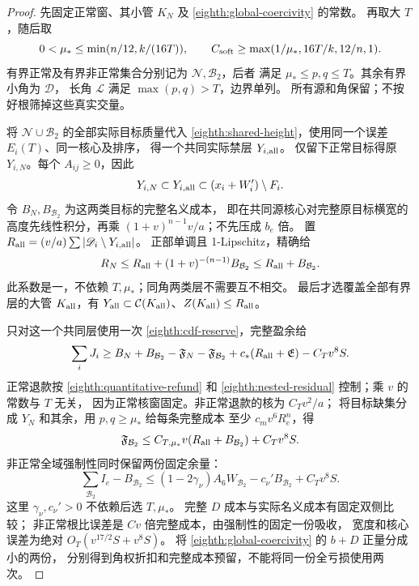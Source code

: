 \begin{proof}
先固定正常窗、其小管 \(K_N\) 及 \eqref{eighth:global-coercivity} 的常数。
再取大 \(T\)，随后取
\[
 0<\mu_*\le\min(n/12,k/(16T)),\qquad
 C_{\rm soft}\ge\max(1/\mu_*,16T/k,12/n,1).
\]
有界正常及有界非正常集合分别记为 \(\mathcal N,\mathcal B_2\)，后者
满足 \(\mu_*\le p,q\le T\)。其余有界小角为 \(\mathcal D\)，
长角 \(\mathcal L\) 满足 \(\max(p,q)>T\)，边界单列。
所有源和角保留；不按好根筛掉这些真实交量。

将 \(\mathcal N\cup\mathcal B_2\) 的全部实际目标质量代入
\eqref{eighth:shared-height}，使用同一个误差 \(E_i(T)\)、同一核心及排序，
得一个共同实际禁层 \(Y_{i,\rm all}\)。
仅留下正常目标得原 \(Y_{i,N}\)。每个 \(A_{ij}\ge0\)，因此
\[
 Y_{i,N}\subset Y_{i,\rm all}\subset(x_i+W_i')\setminus F_i.
\]
令 \(B_N,B_{\mathcal B_2}\) 为这两类目标的完整名义成本，
即在共同源核心对完整原目标横宽的高度先线性积分，再乘
\((1+v)^{n-1}v/a\)；不先压成 \(b_e\) 倍。
置 \(R_{\rm all}=(v/a)\sum|\mathscr D_i\setminus Y_{i,\rm all}|\)。
正部单调且 1-Lipschitz，精确给
\begin{equation}\label{eighth:nested-residual}
 R_N\le R_{\rm all}+(1+v)^{-(n-1)}B_{\mathcal B_2}
       \le R_{\rm all}+B_{\mathcal B_2}.
\end{equation}
此系数是一，不依赖 \(T,\mu_*\)；同角两类层不需要互不相交。
最后才选覆盖全部有界层的大管 \(K_{\rm all}\)，有
\(Y_{\rm all}\subset\mathcal C(K_{\rm all})\)、\(Z(K_{\rm all})\le R_{\rm all}\)。

只对这一个共同层使用一次 \eqref{eighth:cdf-reserve}，完整盈余给
\[
 \sum_iJ_i\ge B_N+B_{\mathcal B_2}-\mathfrak F_N-\mathfrak F_{\mathcal B_2}
                  +c_*(R_{\rm all}+\mathfrak E)-C_Tv^8S.
\]
正常退款按 \eqref{eighth:quantitative-refund} 和
\eqref{eighth:nested-residual} 控制；乘 \(v\) 的常数与 \(T\) 无关，
因为正常核窗固定。非正常退款的核为 \(C_Tv^2/a\)；
将目标缺集分成 \(Y_N\) 和其余，用 \(p,q\ge \mu_*\) 给每条完整成本
至少 \(c_mv^6R_e^n\)，得
\[
 \mathfrak F_{\mathcal B_2}
 \le C_{T,\mu_*}v(R_{\rm all}+B_{\mathcal B_2})+C_Tv^8S.
\]
非正常全域强制性同时保留两份固定余量：
\begin{equation}\label{eighth:bad-discount}
 \sum_{\mathcal B_2}I_e-B_{\mathcal B_2}
 \le(1-2\gamma_\nu)A_6W_{\mathcal B_2}
                 -c_\nu'B_{\mathcal B_2}+C_Tv^8S .
\end{equation}
这里 \(\gamma_\nu,c_\nu'>0\) 不依赖后选 \(T,\mu_*\)。
完整 \(D\) 成本与实际名义成本有固定双侧比较；
非正常根比误差是 \(Cv\) 倍完整成本，由强制性的固定一份吸收，
宽度和核心误差为绝对 \(O_T(v^{17/2}S+v^8S)\)。
将 \eqref{eighth:global-coercivity} 的 \(b+D\) 正量分成小的两份，
分别得到角权折扣和完整成本预留，不能将同一份全亏损使用两次。


\end{proof}
